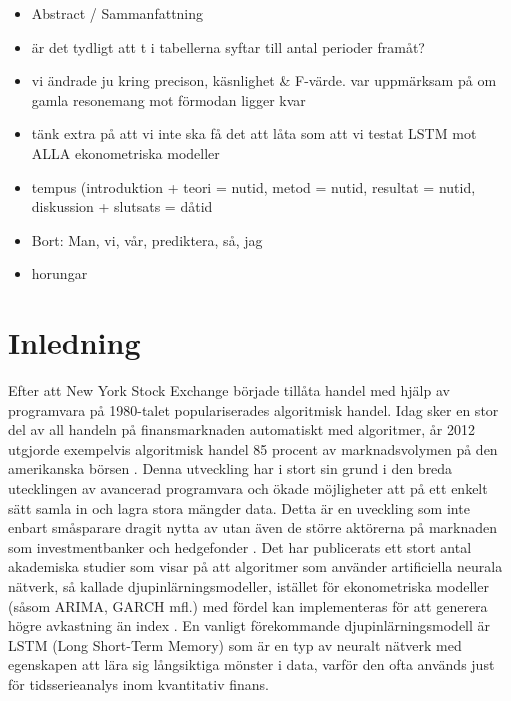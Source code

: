 \documentclass[11pt]{article}
\numberwithin{equation}{section}
\numberwithin{table}{section}
\numberwithin{figure}{section}
\begin{document}
\newpage
\thispagestyle{empty}

\begin{itemize}
    \item Abstract / Sammanfattning
    \item är det tydligt att t i tabellerna syftar till antal perioder framåt?
    \item vi ändrade ju kring precison, käsnlighet \& F-värde. var uppmärksam på om gamla resonemang mot förmodan ligger kvar
    \item tänk extra på att vi inte ska få det att låta som att vi testat LSTM mot ALLA ekonometriska modeller
    
    \item tempus (introduktion + teori = nutid, metod = nutid, resultat = nutid,  diskussion + slutsats = dåtid
    \item Bort: Man, vi, vår, prediktera, så, jag
    \item horungar
\end{itemize}

\newpage
\clearpage
\setcounter{page}{1}


\section{Inledning}
Efter att New York Stock Exchange började tillåta handel med hjälp av programvara på 1980-talet populariserades algoritmisk handel.  Idag sker en stor del av all handeln på finansmarknaden automatiskt med algoritmer, år 2012 utgjorde exempelvis algoritmisk handel 85 procent av marknadsvolymen på den amerikanska börsen \parencite[][,s.258]{glantz2013multi}. Denna utveckling har i stort sin grund i den breda utecklingen av avancerad programvara och ökade möjligheter att på ett enkelt sätt samla in och lagra stora mängder data. Detta är en uveckling som inte enbart småsparare dragit nytta av utan även de större aktörerna på marknaden som investmentbanker och hedgefonder \parencite{DE_Shaw}. Det har publicerats ett stort antal akademiska studier som visar på att algoritmer som använder artificiella neurala nätverk, så kallade djupinlärningsmodeller, istället för ekonometriska modeller (såsom ARIMA, GARCH mfl.) med fördel kan implementeras för att generera högre avkastning än index \parencite{paliwal2009neural}. En vanligt förekommande djupinlärningsmodell är LSTM (Long Short-Term Memory) som är en typ av neuralt nätverk med egenskapen att lära sig långsiktiga mönster i data, varför den ofta används just för tidsserieanalys inom kvantitativ finans.
\end{document}

